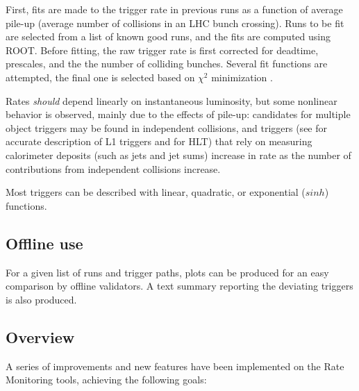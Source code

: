 First, fits are made to the trigger rate in previous runs as a function of average pile-up (average number of collisions in an LHC bunch crossing). Runs to be fit are selected from a list of known good runs, and the fits are computed using ROOT. Before fitting, the raw trigger rate is first corrected for deadtime, prescales, and the the number of colliding bunches. Several fit functions are attempted, the final one is selected based on $\chi^2$ minimization \cite{Smith:2293136}.

Rates \textit{should} depend linearly on instantaneous luminosity, but some nonlinear behavior is observed, mainly due to the effects of pile-up: candidates for multiple object triggers may be found in independent collisions, and triggers (see \cite{Sirunyan:2721198} for accurate description of L1 triggers and \cite{Gori_2014} for HLT) that rely on measuring calorimeter deposits (such as jets and jet sums) increase in rate as the number of contributions from independent collisions increase.

Most triggers can be described with linear, quadratic, or exponential ($sinh$) functions.
 
\subsection{Offline use}

For a given list of runs and trigger paths, plots can be produced for an easy comparison by offline validators. A text summary reporting the deviating triggers is also produced.

\subsection{Overview}

A series of improvements and new features have been implemented on the Rate Monitoring tools, achieving the following goals:

